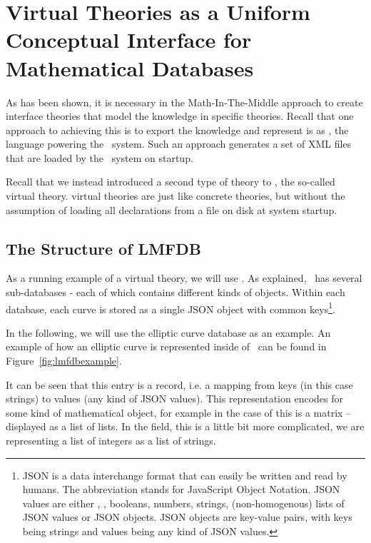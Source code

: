 \section{Virtual Theories as a Uniform Conceptual Interface for Mathematical Databases}\label{sec:vt}

As has been shown, it is necessary in the Math-In-The-Middle approach to create interface theories that model the knowledge in specific theories. 
Recall that one approach to achieving this is to export the knowledge and represent is as \omdocmmt, the language powering the \mmt\ system. 
Such an approach generates a set of XML files that are loaded by the \mmt\ system on startup. 

Recall that we instead introduced a second type of theory to \mmt, the so-called virtual theory.
virtual theories are just like concrete theories, but without the assumption of loading all declarations from a file on disk at system startup. 

\subsection{The Structure of LMFDB}\label{sec:vt:lmfdb}

As a running example of a virtual theory, we will use \lmfdb. 
As explained, \lmfdb\ has several sub-databases - each of which contains different kinds of objects. 
Within each database, each curve is stored as a single JSON object with common keys\footnote{
  JSON \cite{JSON:web} is a data interchange format that can easily be written and read by humans. 
  The abbreviation stands for JavaScript Object Notation. 
  JSON values are either , , booleans, numbers, strings, (non-homogenous) lists of JSON values or JSON objects. 
  JSON objects are key-value pairs, with keys being strings and values being any kind of JSON values. 
}.


In the following, we will use the elliptic curve database as an example. 
An example of how an elliptic curve is represented inside of \lmfdb\ can be found in Figure~\ref{fig:lmfdbexample}.

It can be seen that this entry is a record, i.e. a mapping from keys (in this case strings) to values (any kind of JSON values). 
This representation encodes for some kind of mathematical object, for example in the case of  this is a matrix -- displayed as a list of lists.
In the  field, this is a little bit more complicated, we are representing a list of integers as a list of strings.

